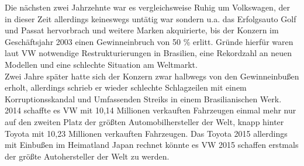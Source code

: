 \documentclass[12pt]{article}
\begin{document}
	Die nächsten zwei Jahrzehnte war es vergleichsweise Ruhig um  Volkswagen, der in dieser Zeit allerdings keineswegs untätig war sondern u.a. das Erfolgsauto Golf und Passat hervorbrach und weitere Marken akquirierte, bis der Konzern im Geschäftsjahr 2003 einen Gewinneinbruch von 50 \% erlitt. Gründe hierfür waren laut VW notwendige Restrukturierungen in Brasilien, eine Rekordzahl an neuen Modellen und eine schlechte Situation am Weltmarkt. \cite{sud} \\
	Zwei Jahre später hatte sich der Konzern zwar halbwegs von den Gewinneinbußen erholt, allerdings schrieb er wieder schlechte Schlagzeilen mit einem Korruptionsskandal und Umfassenden Streiks in einem Brasilianischen Werk. \cite{autowp}\\
	2014 schaffte es VW mit 10,14 Millionen verkauften Fahrzeugen einmal mehr nur auf den zweiten Platz der größten Automobilhersteller der Welt, knapp hinter Toyota mit 10,23 Millionen verkauften Fahrzeugen. Das Toyota 2015 allerdings mit Einbußen im Heimatland Japan rechnet könnte es VW 2015 schaffen erstmals der größte Autohersteller der Welt zu werden.
	
	
	
	
	\newpage
	\listoftables
	\listoffigures
	\printglossaries
\end{document}
